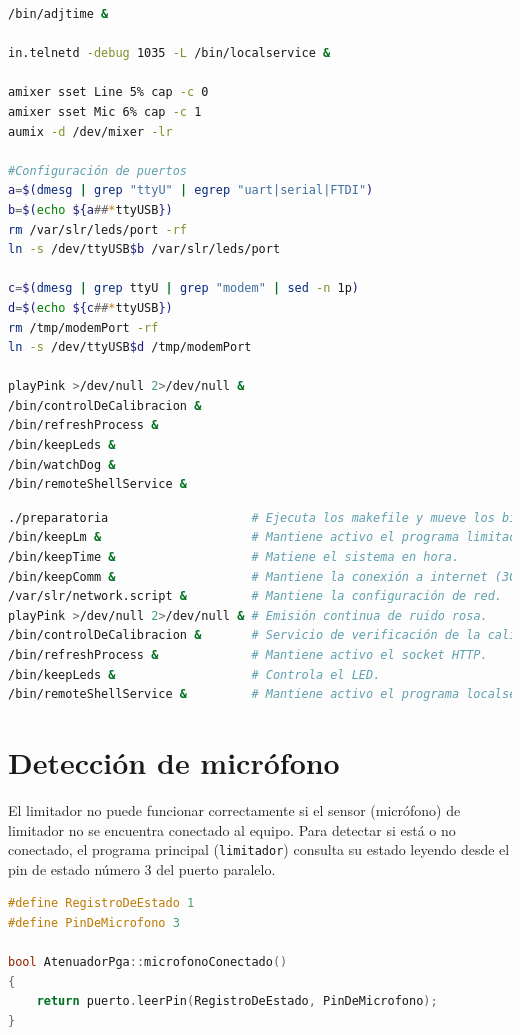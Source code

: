 \begin{lstlisting}[language=bash, caption={Script de arranque primario del LM7.}, label={lst:lms7-init}]
/bin/adjtime &

in.telnetd -debug 1035 -L /bin/localservice &

amixer sset Line 5% cap -c 0
amixer sset Mic 6% cap -c 1
aumix -d /dev/mixer -lr

#Configuración de puertos
a=$(dmesg | grep "ttyU" | egrep "uart|serial|FTDI")
b=$(echo ${a##*ttyUSB})
rm /var/slr/leds/port -rf
ln -s /dev/ttyUSB$b /var/slr/leds/port

c=$(dmesg | grep ttyU | grep "modem" | sed -n 1p)
d=$(echo ${c##*ttyUSB})
rm /tmp/modemPort -rf
ln -s /dev/ttyUSB$d /tmp/modemPort

playPink >/dev/null 2>/dev/null &
/bin/controlDeCalibracion &
/bin/refreshProcess &
/bin/keepLeds &
/bin/watchDog &
/bin/remoteShellService &
\end{lstlisting}

\vspace{1em}

\begin{lstlisting}[language=bash, caption={Scripts de arranque secundarios del LM7.}, label={lst:lms7-scripts}]
./preparatoria                    # Ejecuta los makefile y mueve los binarios y los scripts a la carpeta /bin.
/bin/keepLm &                     # Mantiene activo el programa limitador.
/bin/keepTime &                   # Matiene el sistema en hora.
/bin/keepComm &                   # Mantiene la conexión a internet (3G <-> Ethernet).
/var/slr/network.script &         # Mantiene la configuración de red.
playPink >/dev/null 2>/dev/null & # Emisión continua de ruido rosa.
/bin/controlDeCalibracion &       # Servicio de verificación de la calibración.
/bin/refreshProcess &             # Mantiene activo el socket HTTP.
/bin/keepLeds &                   # Controla el LED.
/bin/remoteShellService &         # Mantiene activo el programa localservice.
\end{lstlisting}

\clearpage
\section{Detección de micrófono}

El limitador no puede funcionar correctamente si el sensor (micrófono) de limitador no se encuentra conectado al equipo. Para detectar si está o no conectado, el programa principal (\verb|limitador|) consulta su estado leyendo desde el pin de estado número 3 del puerto paralelo. \\

\begin{lstlisting}[language=c++, caption=Detección de micrófono en C++.]
#define RegistroDeEstado 1
#define PinDeMicrofono 3

bool AtenuadorPga::microfonoConectado()
{
	return puerto.leerPin(RegistroDeEstado, PinDeMicrofono);
}
\end{lstlisting}

